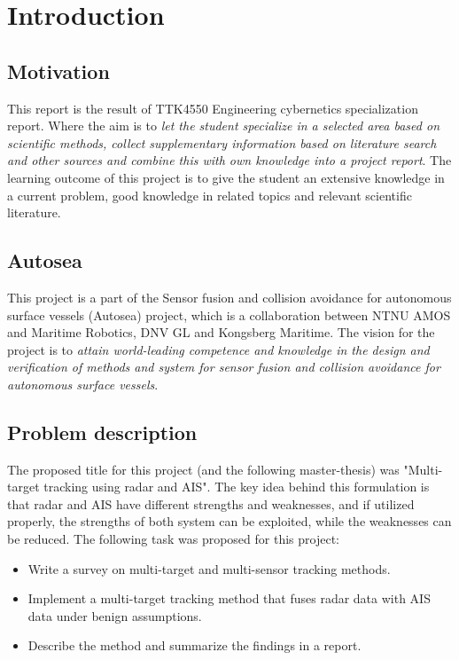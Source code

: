 \section{Introduction}
\subsection{Motivation}
This report is the result of TTK4550 Engineering cybernetics specialization report. Where the aim is to \emph{let the student specialize in a selected area based on scientific methods, collect supplementary information based on literature search and other sources and combine this with own knowledge into a project report}. The learning outcome of this project is to give the student an extensive knowledge in a current problem, good knowledge in related topics and relevant scientific literature.

\subsection{Autosea}
This project is a part of the Sensor fusion and collision avoidance for autonomous surface vessels (Autosea) project, which is a collaboration between NTNU AMOS and Maritime Robotics, DNV GL and Kongsberg Maritime. The vision for the project is to \emph{attain world-leading competence and knowledge in the design and verification of methods and system for sensor fusion and collision avoidance for autonomous surface vessels}.

\subsection{Problem description}
The proposed title for this project (and the following master-thesis) was "Multi-target tracking using radar and AIS". The key idea behind this formulation is that radar and AIS have different strengths and weaknesses, and if utilized properly, the strengths of both system can be exploited, while the weaknesses can be reduced. The following task was proposed for this project:
\begin{itemize}
\item Write a survey on multi-target and multi-sensor tracking methods.
\item Implement a multi-target tracking method that fuses radar data with AIS data under benign assumptions.
\item Describe the method and summarize the findings in a report.
\end{itemize}

